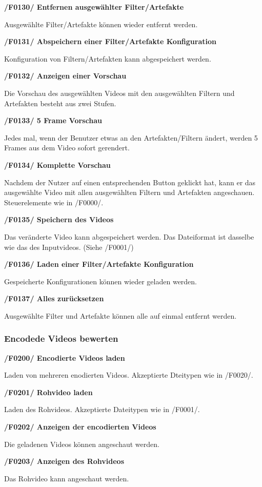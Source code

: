 \documentclass[parskip=full]{scrartcl}
\begin{document}
\textbf{/F0130/ Entfernen ausgewählter Filter/Artefakte}

Ausgewählte Filter/Artefakte können wieder entfernt werden.

\textbf{/F0131/ Abspeichern einer Filter/Artefakte Konfiguration}

Konfiguration von Filtern/Artefakten kann abgespeichert werden.

\textbf{/F0132/ Anzeigen einer Vorschau}

Die Vorschau des ausgewählten Videos mit den ausgewählten Filtern und Artefakten besteht aus zwei Stufen.

\textbf{/F0133/ 5 Frame Vorschau}

Jedes mal, wenn der Benutzer etwas an den Artefakten/Filtern ändert, werden 5 Frames aus dem Video sofort gerendert.

\textbf{/F0134/ Komplette Vorschau}

Nachdem der Nutzer auf einen entsprechenden Button geklickt hat, kann er das ausgewählte Video mit allen ausgewählten Filtern und Artefakten angeschauen. Steuerelemente wie in /F0000/.

\textbf{/F0135/ Speichern des Videos}

Das veränderte Video kann abgespeichert werden. Das Dateiformat ist dasselbe wie das des Inputvideos. (Siehe /F0001/)

\textbf{/F0136/ Laden einer Filter/Artefakte Konfiguration}

Gespeicherte Konfigurationen können wieder geladen werden.

\textbf{/F0137/ Alles zurücksetzen}

Ausgewählte Filter und Artefakte können alle auf einmal entfernt werden.
\subsubsection{Encodede Videos bewerten}
\textbf{/F0200/ Encodierte Videos laden}

Laden von mehreren enodierten Videos. Akzeptierte Dteitypen wie in /F0020/.

\textbf{/F0201/ Rohvideo laden}

Laden des Rohvideos. Akzeptierte Dateitypen wie in /F0001/.

\textbf{/F0202/ Anzeigen der encodierten Videos}

Die geladenen Videos können angeschaut werden.

\textbf{/F0203/ Anzeigen des Rohvideos}

Das Rohvideo kann angeschaut werden.
\end{document}
